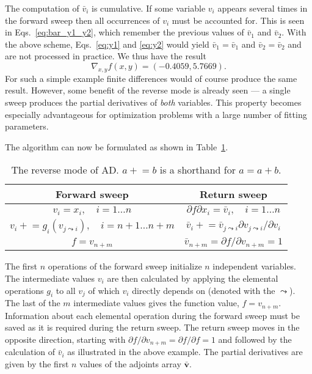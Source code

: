 \documentclass{article}
\begin{document}
The computation of $\bar v_i$ is cumulative. If some variable $v_i$
appears several times in the forward sweep then all occurrences of
$v_i$ must be accounted for. This is seen in
Eqs.~\eqref{eq:bar_y1_y2}, which remember the previous values of
$\bar v_1$ and $\bar v_2$. With the above scheme, Eqs.~\eqref{eq:y1}
and \eqref{eq:y2} would yield $\bar v_1 = \bar v_1$ and
$\bar v_2 = \bar v_2$ and are not processed in practice. We thus have
the result
\begin{equation}
  \label{eq:Fgrad}
  \nabla_{x,y} f(x,y) = (-0.4059,5.7669).
\end{equation}
For such a simple example finite differences would of course produce
the same result. However, some benefit of the reverse mode is already
seen --- a single sweep produces the partial derivatives of
\textit{both} variables. This property becomes especially advantageous
for optimization problems with a large number of fitting parameters.

The algorithm can now be formulated as shown in Table~\ref{tab:AD}.
\begin{table}[h]
  \centering
  \caption{The reverse mode of AD. $a\mathrel{+}=b$ is a shorthand for
    $a = a + b$.}
  \begin{tabular}{c|c}
    Forward sweep & Return sweep \\ \hline
    $v_i = x_i, \quad i=1\ldots n$ & $\partial f\partial x_i = \bar
                                     v_i, \quad i=1\ldots n$ \\
    $v_i \mathrel{+}= g_i(v_{j \leadsto i}), \quad i=n+1\ldots n+m$
                  & $\bar v_i \mathrel{+}= \bar v_{j \leadsto
                    i} \partial v_{j \leadsto i}/\partial v_i$ \\
    $f = v_{n+m}$ & $\bar v_{n+m} = \partial f/\partial v_{n+m} = 1$
  \end{tabular}
  \label{tab:AD}
\end{table}
The first $n$ operations of the forward sweep initialize $n$
independent variables. The intermediate values $v_i$ are then
calculated by applying the elemental operations $g_i$ to all $v_j$ of
which $v_i$ directly depends on (denoted with the $\leadsto$). The
last of the $m$ intermediate values gives the function value,
$f = v_{n+m}$. Information about each elemental operation during the
forward sweep must be saved as it is required during the return
sweep. The return sweep moves in the opposite direction, starting with
$\partial f/\partial v_{n+m} = \partial f/\partial f = 1$ and followed
by the calculation of $\bar v_i$ as illustrated in the above
example. The partial derivatives are given by the first $n$ values of
the adjoints array $\bm{\bar v}$.
\end{document}
